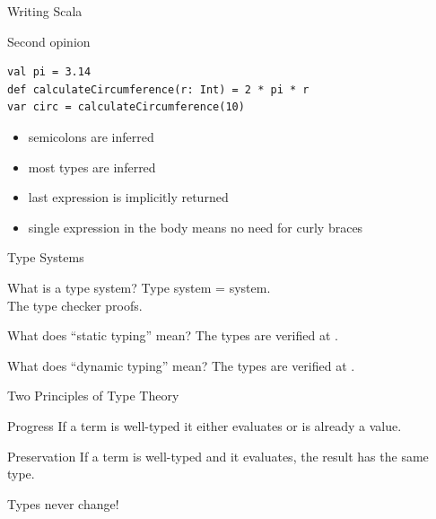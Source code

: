 \begin{frame}[fragile]{Writing Scala}
\begin{exampleblock}{Second opinion}
\begin{lstlisting}
val pi = 3.14
def calculateCircumference(r: Int) = 2 * pi * r
var circ = calculateCircumference(10)
\end{lstlisting}
\end{exampleblock}
\begin{itemize}
  \item semicolons are inferred
  \item most types are inferred
  \item last expression is implicitly returned
  \item single expression in the body means no need for curly braces
\end{itemize}
\end{frame}

\begin{frame}{Type Systems}
\begin{block}{What is a type system?}
\pause
Type system =  system.\\
The type checker  proofs.
\end{block}
\pause
\begin{block}{What does ``static typing'' mean?}
\pause
The types are verified at .
\end{block}
\pause
\begin{block}{What does ``dynamic typing'' mean?}
\pause
The types are verified at .
\end{block}
\end{frame}

\begin{frame}{Two Principles of Type Theory}
\begin{block}{Progress}
If a term is well-typed it either evaluates or is already a value.
\end{block}
\pause
{}
\pause
\begin{block}{Preservation}
If a term is well-typed and it evaluates, the result has the same type.
\end{block}
\begin{center}
\pause
Types \alert{never} change!
\end{center}
\end{frame}

